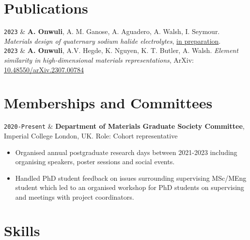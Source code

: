 \documentclass[11pt,a4paper]{article}
\newcommand{\ICL}{Imperial College London}
\newcommand{\LastName}{Onwuli}
\newcommand{\Initials}{A}
\newcommand{\Me}{\textbf{\Initials. \LastName}}  %
\newcommand{\Aron}{A. Walsh}
\newcommand{\Keith}{K. T. Butler}
\newcommand{\Alex}{A. M. Ganose}
\newcommand{\Ieuan}{I. Seymour}
\newcommand{\Ainara}{A. Aguadero}
\newcommand{\Ashish}{A.V. Hegde}
\newcommand{\Kevin}{K. Nguyen}
\newcommand{\Duration}[2]{\fontsize{10pt}{0}\selectfont \texttt{#1-#2}}
\newcommand{\Year}[1]{\fontsize{10pt}{0}\selectfont \texttt{#1}}
\newcommand{\Ongoing}{Present}
\newcommand{\Preprint}[1]{\faFilePdf{} ArXiv: \href{https://doi.org/#1}{#1}}
\begin{document}
\section{Publications}

\begin{EntriesTableYear}
  \Year{2023}  &
  \Me, \Alex, \Ainara, \Aron, \Ieuan.
  \textit{Materials design of quaternary sodium halide electrolytes},
  \underline{in preparation}.
  \\
  \Year{2023}  &
  \Me, \Ashish, \Kevin, \Keith, \Aron.
  \textit{Element similarity in high-dimensional materials representations},
  \Preprint{10.48550/arXiv.2307.00784} 
  \\
\end{EntriesTableYear}
\section{Memberships and Committees}

\begin{EntriesTableDuration}
  \Duration{2020}{\Ongoing} &
  \textbf{Department of Materials Graduate Society Committee}, \ICL{}, UK.
  \newline
  Role: Cohort representative
  \begin{itemize}
    \item Organised annual postgraduate research days between 2021-2023 including organising speakers, poster sessions and social events.
    \item Handled PhD student feedback on issues surrounding supervising MSc/MEng student which led to an organised workshop for PhD students on supervising and meetings with project coordinators.
    \vspace{-\baselineskip}
  \end{itemize}
  \vspace{-\baselineskip}
\end{EntriesTableDuration}
\section{Skills}
\end{document}
